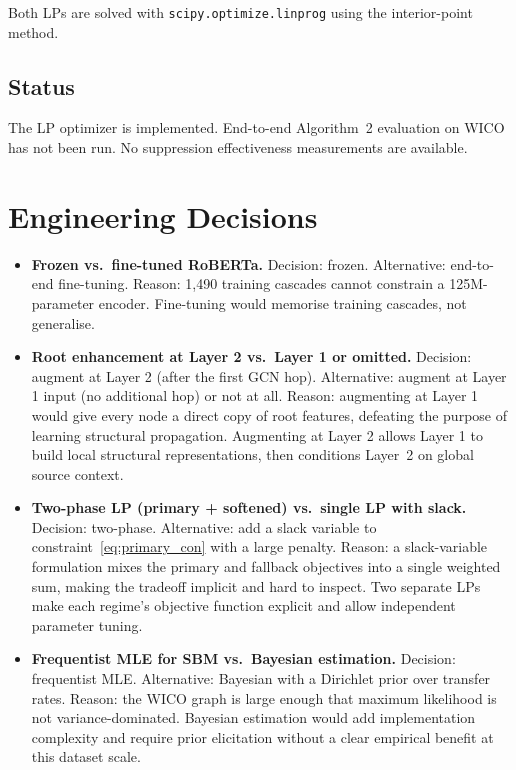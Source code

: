 \documentclass[conference]{IEEEtran}
\begin{document}
Both LPs are solved with \texttt{scipy.optimize.linprog} using the
interior-point method.

\subsection{Status}

The LP optimizer is implemented.
End-to-end Algorithm~2 evaluation on WICO has not been run.
No suppression effectiveness measurements are available.

\section{Engineering Decisions}

\begin{itemize}

  \item \textbf{Frozen vs.\ fine-tuned RoBERTa.}
    Decision: frozen.
    Alternative: end-to-end fine-tuning.
    Reason: 1,490 training cascades cannot constrain a 125M-parameter encoder.
    Fine-tuning would memorise training cascades, not generalise.

  \item \textbf{Root enhancement at Layer 2 vs.\ Layer 1 or omitted.}
    Decision: augment at Layer 2 (after the first GCN hop).
    Alternative: augment at Layer 1 input (no additional hop) or not at all.
    Reason: augmenting at Layer 1 would give every node a direct copy of root
    features, defeating the purpose of learning structural propagation.
    Augmenting at Layer 2 allows Layer 1 to build local structural
    representations, then conditions Layer~2 on global source context.

  \item \textbf{Two-phase LP (primary + softened) vs.\ single LP with slack.}
    Decision: two-phase.
    Alternative: add a slack variable to constraint~\eqref{eq:primary_con} with
    a large penalty.
    Reason: a slack-variable formulation mixes the primary and fallback
    objectives into a single weighted sum, making the tradeoff implicit and
    hard to inspect.
    Two separate LPs make each regime's objective function explicit and allow
    independent parameter tuning.

  \item \textbf{Frequentist MLE for SBM vs.\ Bayesian estimation.}
    Decision: frequentist MLE.
    Alternative: Bayesian with a Dirichlet prior over transfer rates.
    Reason: the WICO graph is large enough that maximum likelihood is not
    variance-dominated.
    Bayesian estimation would add implementation complexity and require
    prior elicitation without a clear empirical benefit at this dataset scale.


\end{itemize}
\end{document}
